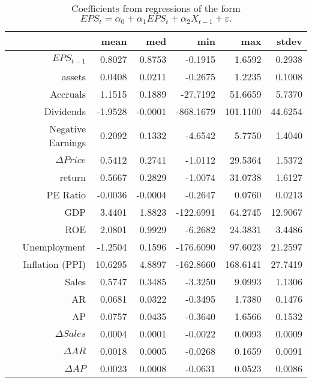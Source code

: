 \begin{table}[ht]
\centering
\begin{tabular}{rrrrrr}
  \hline
 & mean & med & min & max & stdev \\ 
  \hline
$EPS_{t-1}$ & 0.8027 & 0.8753 & -0.1915 & 1.6592 & 0.2938 \\ 
assets & 0.0408 & 0.0211 & -0.2675 & 1.2235 & 0.1008 \\ 
  Accruals & 1.1515 & 0.1889 & -27.7192 & 51.6659 & 5.7370 \\ 
  Dividends & -1.9528 & -0.0001 & -868.1679 & 101.1100 & 44.6254 \\ 
  Negative Earnings & 0.2092 & 0.1332 & -4.6542 & 5.7750 & 1.4040 \\ 
  $\Delta Price$ & 0.5412 & 0.2741 & -1.0112 & 29.5364 & 1.5372 \\ 
  return & 0.5667 & 0.2829 & -1.0074 & 31.0738 & 1.6127 \\ 
  PE Ratio & -0.0036 & -0.0004 & -0.2647 & 0.0760 & 0.0213 \\ 
  GDP & 3.4401 & 1.8823 & -122.6991 & 64.2745 & 12.9067 \\ 
  ROE & 2.0801 & 0.9929 & -6.2682 & 24.3831 & 3.4486 \\ 
  Unemployment & -1.2504 & 0.1596 & -176.6090 & 97.6023 & 21.2597 \\ 
  Inflation (PPI) & 10.6295 & 4.8897 & -162.8660 & 168.6141 & 27.7419 \\ 
  Sales & 0.5747 & 0.3485 & -3.3250 & 9.0993 & 1.1306 \\ 
  AR & 0.0681 & 0.0322 & -0.3495 & 1.7380 & 0.1476 \\ 
  AP & 0.0757 & 0.0435 & -0.3640 & 1.6566 & 0.1532 \\ 
  $\Delta Sales$ & 0.0004 & 0.0001 & -0.0022 & 0.0093 & 0.0009 \\ 
  $\Delta AR$ & 0.0018 & 0.0005 & -0.0268 & 0.1659 & 0.0091 \\ 
  $\Delta AP$ & 0.0023 & 0.0008 & -0.0631 & 0.0523 & 0.0086 \\ 
   \hline
\end{tabular}
\caption{Coefficients from regressions of the form $EPS_{t} = \alpha_0 + \alpha_{1}EPS_{t} + \alpha_{2}X_{t-1} +\varepsilon.$} 
\label{univariate-stats-eps-rsquared}
\end{table}